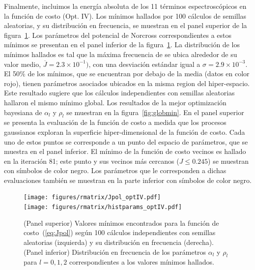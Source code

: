Finalmente, incluimos la energía absoluta de los 11 términos 
espectroscópicos en la función de costo (Opt. IV). Los mínimos hallados 
por 100 cálculos de semillas aleatorias, y su distribución en frecuencia, 
se muestran en el panel superior de la figura~\ref{fig:optIV}. Los 
parámetros del potencial de Norcross correspondientes a estos mínimos se 
presentan en el panel inferior de la figura~\ref{fig:optIV}. La 
distribución de los mínimos hallados es tal que la máxima frecuencia de 
se ubica alrededor de su valor medio, $\overline{J}=2.3\times 10^{-1})$, 
con una desviación estándar igual a $\sigma=2.9\times 10^{-3}$. El 50\% 
de los mínimos, que se encuentran por debajo de la media (datos en color 
rojo), tienen parámetros asociados ubicados en la misma region del 
hiper-espacio. Este resultado sugiere que los cálculos independientes con
semillas aleatorias hallaron el mismo mínimo global. Los resultados de la 
mejor optimización bayesiana de $\alpha_l$ y $\rho_l$ se muestran en la 
figura~\ref{fig:globmin}. En el panel superior se presenta la evaluación 
de la función de costo a medida que los procesos gaussianos exploran la
superficie hiper-dimensional de la función de costo. Cada uno de estos 
puntos se corresponde a un punto del espacio de parámetros, que se 
muestra en el panel inferior. El mínimo de la función de costo vecinos es 
hallado en la iteración 81; este punto y sus vecinos más cercanos 
($J\leq 0.245$) se muestran con símbolos de color negro. Los parámetros 
que le corresponden a dichas evaluaciones también se muestran en la parte
inferior con símbolos de color negro.

\begin{figure}
\centering
\texttt{[image: figures/rmatrix/Jpol\_optIV.pdf]} \\
\texttt{[image: figures/rmatrix/histparams\_optIV.pdf]}
\caption[Distribución de mínimos y parámetros según semillas aleatorias.]
{(Panel superior) Valores mínimos encontrados para la función de 
costo~(\ref{eq:Jpol}) según 100 cálculos independientes con semillas 
aleatorias (izquierda) y su distribución en frecuencia (derecha).
(Panel inferior) Distribución en frecuencia de los parámetros $\alpha_l$ 
y $\rho_l$ para $l=0,1,2$ correspondientes a los valores mínimos 
hallados.}
\label{fig:optIV}
\end{figure}

